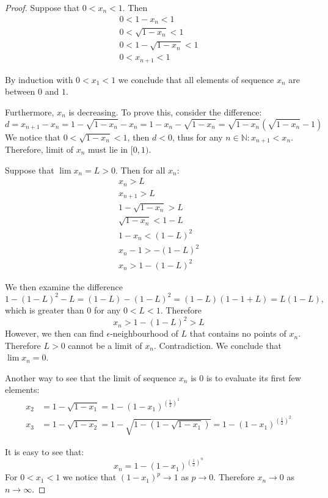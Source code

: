 \documentclass{article}
\newcommand{\N}{\mathbb{N}}
\begin{document}
\begin{proof}

Suppose that $0 < x_n < 1$. Then
\begin{gather*}
    0<1-x_n<1 \\
    0<\sqrt{1-x_n}<1 \\
    0<1-\sqrt{1-x_n}<1 \\
    0<x_{n+1}<1
\end{gather*}

By induction with $0 < x_1 < 1$ we conclude that all elements of sequence $x_n$ are between $0$ and $1$.

Furthermore, $x_n$ is decreasing.
To prove this, consider the difference:
\[ d = x_{n+1} - x_n = 1-\sqrt{1-x_n} - x_n = 1-x_n - \sqrt{1-x_n} = \sqrt{1-x_n} \left(\sqrt{1-x_n}-1\right) \]
We notice that $0 < \sqrt{1-x_n} < 1$, then $d < 0$, thus for any $n\in\N: x_{n+1} < x_n$.
Therefore, limit of $x_n$ must lie in $[0,1)$.

Suppose that $\lim x_n = L > 0$.
Then for all $x_n$:
\begin{gather*}
    x_n > L \\
    x_{n+1} > L \\
    1-\sqrt{1-x_n} > L \\
    \sqrt{1-x_n} < 1-L \\
    1-x_n < (1-L)^2 \\
    x_n-1 > -(1-L)^2 \\
    x_n > 1-(1-L)^2   
\end{gather*}

We then examine the difference
\[ 1-(1-L)^2 - L = (1-L) - (1-L)^2 = (1-L)(1-1+L) = L(1-L), \]
which is greater than $0$ for any $0<L<1$. Therefore
\[ x_n > 1-(1-L)^2 > L \]
However, we then can find $\epsilon$-neighbourhood of $L$ that contains no points of $x_n$.
Therefore $L>0$ cannot be a limit of $x_n$.
Contradiction.
We conclude that $\lim x_n = 0$.

Another way to see that the limit of sequence $x_n$ is $0$ is to evaluate its first few elements:
\begin{align*}
    x_2 & = 1-\sqrt{1-x_1} = 1-(1-x_1)^{\left(\frac{1}{2}\right)^1} \\
    x_3 & = 1-\sqrt{1-x_2} = 1-\sqrt{1-\left(1-\sqrt{1-x_1}\right)} = 1-(1-x_1)^{\left(\frac{1}{2}\right)^2}
\end{align*}
    
It is easy to see that:
\[ x_n = 1-(1-x_1)^{\left(\frac{1}{2}\right)^n} \]
For $0 < x_1 <1$ we notice that $(1-x_1)^p \to 1$ as $p \to 0$.
Therefore $x_n \to 0$ as $n \to \infty$.

\end{proof}
\end{document}
